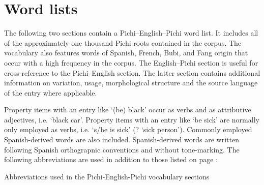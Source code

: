 \chapter{Word lists}
The following two sections contain a Pichi–English–Pichi word list. It includes all of the approximately one thousand Pichi roots contained in the corpus. The vocabulary also features words of Spanish, French, Bubi, and Fang origin that occur with a high frequency in the corpus. The English–Pichi section is useful for cross-reference to the Pichi–English section. The latter section contains additional information on variation, usage, morphological structure and the source language of the entry where applicable. 


Property items with an entry like  ‘(be) black’ occur as verbs and as attributive adjectives, i.e.  ‘black car’. Property items with an entry like  ‘be sick’ are normally only employed as verbs, i.e.  ‘s/he is sick’ (? ‘sick person’). Commonly employed Spanish-derived words are also included. Spanish-derived words are written following Spanish orthograpnic conventions and without tone-marking. The following abbreviations are used in addition to those listed on page \pageref{sec:abbr}:


\begin{styleTableEnglish}
Abbreviations used in the Pichi-English-Pichi vocabulary sections
\end{styleTableEnglish}

